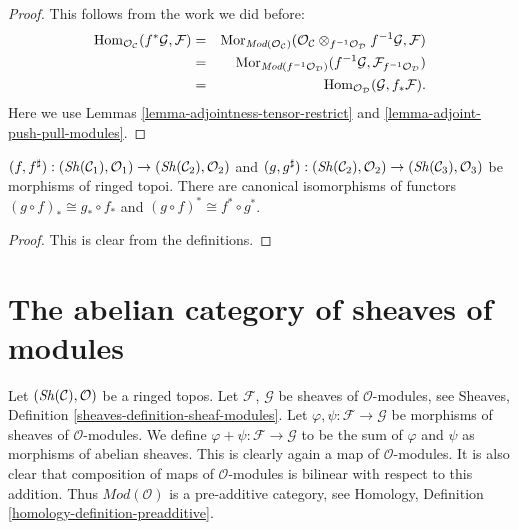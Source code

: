 \begin{proof}
This follows from the work we did before:
\begin{eqnarray*}
\mathop{\mathrm{Hom}}\nolimits_{\mathcal{O}_\mathcal{C}}(f^*\mathcal{G}, \mathcal{F})
& = &
\mathop{\mathrm{Mor}}\nolimits_{\textit{Mod}(\mathcal{O}_\mathcal{C})}(
\mathcal{O}_\mathcal{C}
\otimes_{f^{-1}\mathcal{O}_\mathcal{D}} f^{-1}\mathcal{G},
\mathcal{F}) \\
& = &
\mathop{\mathrm{Mor}}\nolimits_{\textit{Mod}(f^{-1}\mathcal{O}_\mathcal{D})}(
f^{-1}\mathcal{G}, \mathcal{F}_{f^{-1}\mathcal{O}_\mathcal{D}}) \\
& = &
\mathop{\mathrm{Hom}}\nolimits_{\mathcal{O}_\mathcal{D}}(\mathcal{G}, f_*\mathcal{F}).
\end{eqnarray*}
Here we use Lemmas \ref{lemma-adjointness-tensor-restrict}
and \ref{lemma-adjoint-push-pull-modules}.
\end{proof}

\begin{lemma}
\label{lemma-push-pull-composition-modules}
$(f, f^\sharp) :
(\mathop{\mathit{Sh}}\nolimits(\mathcal{C}_1), \mathcal{O}_1)
\to (\mathop{\mathit{Sh}}\nolimits(\mathcal{C}_2), \mathcal{O}_2)$ and
$(g, g^\sharp) :
(\mathop{\mathit{Sh}}\nolimits(\mathcal{C}_2), \mathcal{O}_2) \to
(\mathop{\mathit{Sh}}\nolimits(\mathcal{C}_3), \mathcal{O}_3)$
be morphisms of ringed topoi.
There are canonical isomorphisms of functors
$(g \circ f)_* \cong g_* \circ f_*$ and
$(g \circ f)^* \cong f^* \circ g^*$.
\end{lemma}

\begin{proof}
This is clear from the definitions.
\end{proof}





\section{The abelian category of sheaves of modules}
\label{section-kernels}

\noindent
Let $(\mathop{\mathit{Sh}}\nolimits(\mathcal{C}), \mathcal{O})$ be a ringed topos.
Let $\mathcal{F}$, $\mathcal{G}$ be sheaves of $\mathcal{O}$-modules, see
Sheaves, Definition \ref{sheaves-definition-sheaf-modules}.
Let $\varphi, \psi : \mathcal{F} \to \mathcal{G}$
be morphisms of sheaves of $\mathcal{O}$-modules.
We define $\varphi + \psi : \mathcal{F} \to \mathcal{G}$
to be the sum of $\varphi$ and $\psi$ as morphisms of abelian sheaves.
This is clearly again a map of $\mathcal{O}$-modules.
It is also clear that composition of maps of
$\mathcal{O}$-modules is bilinear with respect to this
addition. Thus $\textit{Mod}(\mathcal{O})$ is a pre-additive
category, see Homology, Definition \ref{homology-definition-preadditive}.


